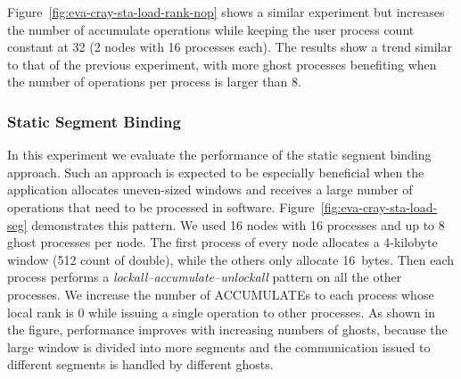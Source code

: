 Figure~\ref{fig:eva-cray-sta-load-rank-nop} shows a similar
experiment but increases the number of accumulate operations while
keeping the user process count constant at 32 (2 nodes with 16
processes each).  The results show a trend similar to that of the previous
experiment, with more ghost processes benefiting when the number of
operations per process is larger than 8.

\subsubsection{Static Segment Binding}\label{sec:eva-static-seg}

In this experiment we evaluate the performance of the static segment binding approach.  Such an approach is expected to be especially
beneficial when the application allocates uneven-sized windows and
receives a large number of operations that need to be processed in
software.  Figure~\ref{fig:eva-cray-sta-load-seg} demonstrates this
pattern.  We used 16 nodes with 16 processes and up to 8 ghost
processes per node.  The first
process of every node allocates a 4-kilobyte window (512 count of
double), while the others only allocate 16~bytes.  Then each process
performs a \emph{lockall--accumulate--unlockall} pattern on all the
other processes.  We increase the number of ACCUMULATEs to each
process whose local rank is 0 while issuing a single operation to
other processes.  As shown in the figure, performance improves with
increasing numbers of ghosts, because the large window is divided into
more segments and the communication issued to different segments is
handled by different ghosts.

